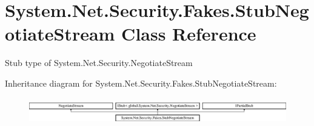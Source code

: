 \hypertarget{class_system_1_1_net_1_1_security_1_1_fakes_1_1_stub_negotiate_stream}{\section{System.\-Net.\-Security.\-Fakes.\-Stub\-Negotiate\-Stream Class Reference}
\label{class_system_1_1_net_1_1_security_1_1_fakes_1_1_stub_negotiate_stream}
}


Stub type of System.\-Net.\-Security.\-Negotiate\-Stream 


Inheritance diagram for System.\-Net.\-Security.\-Fakes.\-Stub\-Negotiate\-Stream\-:\begin{figure}[H]
\begin{center}
\leavevmode
\includegraphics[height=1.166667cm]{class_system_1_1_net_1_1_security_1_1_fakes_1_1_stub_negotiate_stream}
\end{center}
\end{figure}
